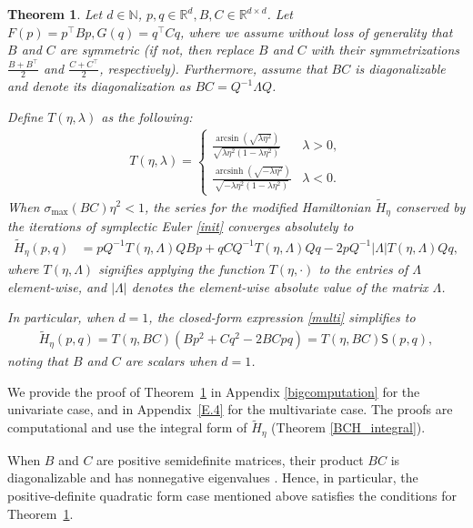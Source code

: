 \documentclass[11pt]{article}
\newtheorem{theorem}{Theorem}
\newcommand{\R}{\mathbb{R}}
\newcommand{\N}{\mathbb{N}}
\DeclareMathOperator\arcsinh{arcsinh}
\begin{document}
\begin{theorem}\label{Thm_Quadratic_MH_multivar}
    Let $d\in\N$, $p, q \in \R^{d}, B, C \in \R^{d \times d}$. Let $F(p)=p^\top Bp, G(q)=q^\top Cq$, where we assume without loss of generality that $B$ and $C$ are symmetric (if not, then replace $B$ and $C$ with their symmetrizations $\frac{B+B^{\top}}{2}$ and $\frac{C+C^{\top}}{2}$, respectively).
    Furthermore, assume that $BC$ is diagonalizable and denote its diagonalization as $BC=Q^{-1}\Lambda Q$. 

    Define $T(\eta, \lambda)$ as the following:
    \begin{gather}
        T(\eta, \lambda) = \begin{cases}
            \frac{\arcsin (\sqrt{\lambda \eta^2})}{\sqrt{\lambda\eta^2(1-\lambda\eta^2)}} & \lambda > 0,\\
    \frac{\arcsinh (\sqrt{-\lambda \eta^2})}{\sqrt{-\lambda\eta^2(1-\lambda\eta^2)}}& \lambda < 0.
        \end{cases}\label{Tfunc}
    \end{gather}
When $\sigma_{\max}(BC)\eta^2<1$, the series for the modified Hamiltonian $\widetilde{H}_{\eta}$ conserved by the iterations of symplectic Euler \eqref{init} converges absolutely to
   \begin{align}
        \widetilde{H}_{\eta}(p, q)&=pQ^{-1}T(\eta, \Lambda) QBp+qCQ^{-1}T(\eta, \Lambda) Qq-2pQ^{-1} |\Lambda|T(\eta, \Lambda) Qq,\label{multi}
    \end{align}
where $T(\eta, \Lambda)$ signifies applying the function $T(\eta, \cdot)$ to the entries of $\Lambda$ element-wise, and $|\Lambda|$ denotes the element-wise absolute value of the matrix $\Lambda$.

In particular, when $d = 1$, the closed-form expression \eqref{multi} simplifies to
\begin{align}
    \widetilde{H}_{\eta}(p, q) = T(\eta, BC)(Bp^2+Cq^2-2BCpq)=T(\eta, BC)\mathsf{S}\left(p,q\right),\label{1D}
\end{align}
noting that $B$ and $C$ are scalars when $d=1$.
\end{theorem}

We provide the proof of Theorem~\ref{Thm_Quadratic_MH_multivar} in Appendix \ref{bigcomputation} for the univariate case, and in Appendix~\ref{E.4} for the multivariate case. The proofs are computational and use the integral form of $\widetilde{H}_{\eta}$ (Theorem \ref{BCH_integral}).

When $B$ and $C$ are positive semidefinite matrices, their product $BC$ is diagonalizable and has nonnegative eigenvalues \citep{HONG1991}. Hence, in particular, the positive-definite quadratic form case mentioned above satisfies the conditions for Theorem~\ref{Thm_Quadratic_MH_multivar}.
\end{document}
